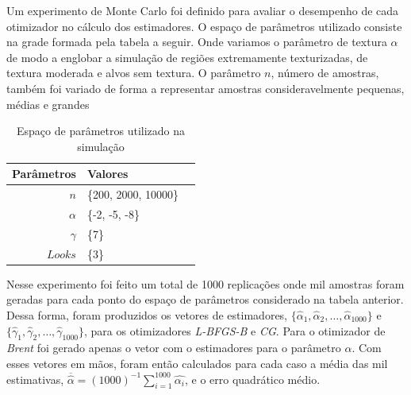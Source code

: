 \documentclass[12pt]{article}
\begin{document}
Um experimento de Monte Carlo foi definido para avaliar o desempenho de cada otimizador no cálculo dos estimadores. O espaço de parâmetros utilizado consiste na grade formada pela tabela a seguir. Onde variamos o parâmetro de textura $\alpha$ de modo a englobar a simulação de regiões extremamente texturizadas, de textura moderada e alvos sem textura. O parâmetro $n$, número de amostras, também foi variado de forma a representar amostras consideravelmente pequenas, médias e grandes
\begin{table}[H]
\centering
\caption{Espaço de parâmetros utilizado na simulação}
\vspace{0.2cm}
\begin{tabular}{r|lr}
\hline
Parâmetros & Valores \\ 
\hline                               
$n$ & \{200, 2000, 10000\} \\
$\alpha$ & \{-2, -5, -8\} \\
$\gamma$ & \{7\} \\
$Looks$ & \{3\}
\end{tabular}
\end{table}

Nesse experimento foi feito um total de 1000 replicações onde mil amostras foram geradas para cada ponto do espaço de parâmetros considerado na tabela anterior. Dessa forma, foram produzidos os vetores de estimadores, $\{\widehat{\alpha}_{1}, \widehat{\alpha}_{2}, \dots, \widehat{\alpha}_{1000} \}$ e $\{\widehat{\gamma}_{1}, \widehat{\gamma}_{2}, \dots, \widehat{\gamma}_{1000} \}$, para os otimizadores \emph{L-BFGS-B} e \emph{CG}. Para o otimizador de \emph{Brent} foi gerado apenas o vetor com o estimadores para o parâmetro $\alpha$. Com esses vetores em mãos, foram então calculados para cada caso a média das mil estimativas, $ \overline{\widehat{\alpha}} = (1000)^{-1} \sum_{i=1}^{1000} \widehat{\alpha_{i}} $, e o erro quadrático médio.
\end{document}
